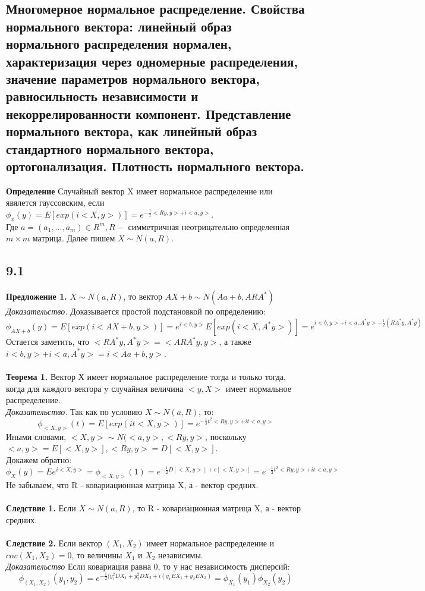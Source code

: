 \subsection{Многомерное нормальное распределение. Свойства нормального вектора: линейный образ нормального распределения нормален, характеризация через одномерные распределения, значение параметров нормального вектора, равносильность независимости и некоррелированности компонент. Представление нормального вектора, как линейный образ стандартного нормального вектора, ортогонализация. Плотность нормального вектора.}
\textbf{Определение} Случайный вектор X имеет нормальное распределение или явялется гауссовским, если $\phi_x(y) = E[exp(i<X, y>)] = e^{-\frac{1}{2}<Ry, y> + i<a, y>}$.\\
Где $a = (a_1, ..., a_m) \in R^m, R -$ симметричная неотрицательно определенная $m\times m$ матрица. Далее пишем $X \sim N(a, R)$.\\
\subsection*{9.1}
\textbf{Предложение 1.} $X\sim N(a, R)$, то вектор $AX + b\sim N(Aa + b, ARA^*)$\\
\textit{Доказательство.} Доказывается простой подстановкой по определению:\\
$\phi_{AX + b}(y) =  E[exp(i<AX + b, y>)] = e^{i<b, y>}E[exp(i<X, A^*y>)] = e^{i<b, y> + i<a, A^*y> - \frac{1}{2}(RA^*y, A^*y)}$\\
Остается заметить, что $<RA^*y, A^*y> = <ARA^*y, y>$, а также $i<b, y> + i<a, A^*y>  = i<Aa + b, y>$.\\
\\
\textbf{Теорема 1.} Вектор Х имеет нормальное распределение тогда и только тогда, когда для каждого вектора y случайная величина $<y, X>$ имеет нормальное распределение.\\
\textit{Доказательство.} Так как по условию $X \sim N(a, R)$, то:\\
$$\phi_{<X, y>}(t) = E[exp(it<X, y>)] = e^{-\frac{1}{2}t^2<Ry, y> + it<a, y>}$$
Иными словами, $<X, y> \sim N(<a, y>, <Ry, y>$, поскольку $<a, y> = E[<X, y>], <Ry, y> = D[<X, y>]$.\\
Докажем обратно:\\
$$\phi_{X}(y) = Ee^{i<X, y>} = \phi_{<X, y>}(1) = e^{-\frac{1}{2}D[<X, y>] + e[<X, y>]} = e^{-\frac{1}{2}t^2<Ry, y> + it<a, y>}$$
Не забываем, что R - ковариационная матрица X, а - вектор средних.\\
\\
\textbf{Следствие 1.} Если $X \sim N(a, R)$, то R - ковариационная матрица X, а - вектор средних.\\
\\
\textbf{Следствие 2.} Если вектор $(X_1, X_2)$ имеет нормальное распределение и $cov(X_1, X_2) = 0$, то величины $X_1$ и $X_2$ независимы.\\
\textit{Доказательство} Если ковариация равна 0, то у нас независимость дисперсий:\\
$$\phi_{(X_1, X_2)}(y_1, y_2) = e^{-\frac{1}{2}(y_1^2DX_1 + y_2^2DX_2 + i(y_1EX_1 + y_2EX_2)} = \phi_{X_1}(y_1)\phi_{X_2}(y_2)$$

